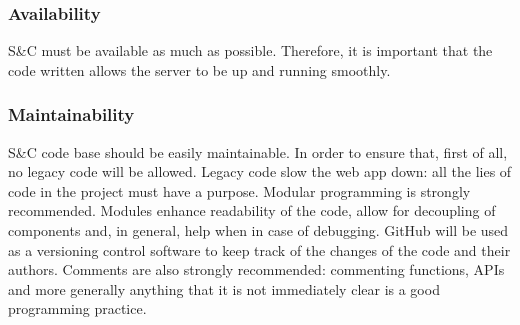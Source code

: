 \subsubsection{Availability}
S\&C must be available as much as possible. Therefore, it is important that the code written allows the server to be up and running smoothly.

\subsubsection{Maintainability}
S\&C code base should be easily maintainable. In order to ensure that, first of all, no legacy code will be allowed. Legacy code slow the web app down: all the lies of code in the project must have a purpose. Modular programming is strongly recommended. Modules enhance readability of the code, allow for decoupling of components and, in general, help when in case of debugging. GitHub will be used as a versioning control software to keep track of the changes of the code and their authors. Comments are also strongly recommended: commenting functions, APIs and more generally anything that it is not immediately clear is a good programming practice.
